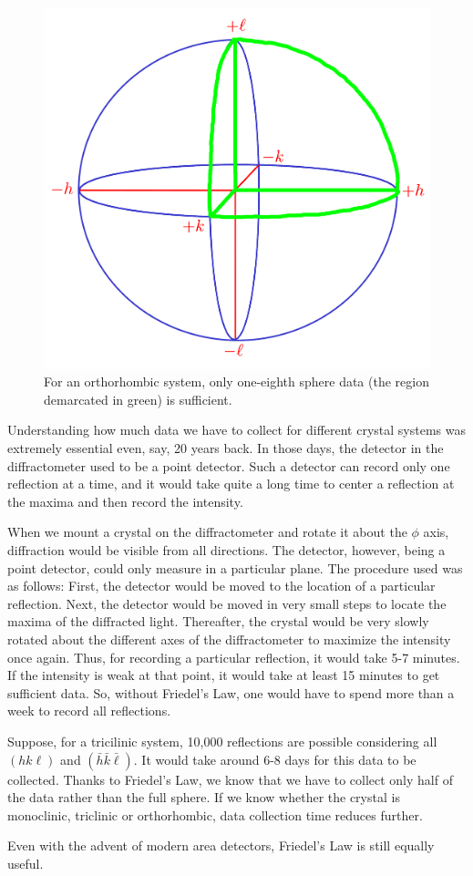 \begin{figure}
	\centering
	\includegraphics[scale=0.15]{one_eighth_sphere.png}
	\caption{\label{fig:one_eighth_sphere}For an orthorhombic system, only one-eighth sphere data (the region demarcated in green) is sufficient.}
\end{figure}

Understanding how much data we have to collect for different crystal systems was extremely essential even, say, 20 years back. In those days, the detector in the diffractometer used to be a point detector. Such a detector can record only one reflection at a time, and it would take quite a long time to center a reflection at the maxima and then record the intensity. 

When we mount a crystal on the diffractometer and rotate it about the $\phi$ axis, diffraction would be visible from all directions. The detector, however, being a point detector, could only measure in a particular plane. The procedure used was as follows: First, the detector would be moved to the location of a particular reflection. Next, the detector would be moved in very small steps to locate the maxima of the diffracted light. Thereafter, the crystal would be very slowly rotated about the different axes of the diffractometer to maximize the intensity once again. Thus, for recording a particular reflection, it would take 5-7 minutes. If the intensity is weak at that point, it would take at least 15 minutes to get sufficient data. So, without Friedel's Law, one would have to spend more than a week to record all reflections.

Suppose, for a tricilinic system, 10,000 reflections are possible considering all $(hk\ell)$ and $(\bar{h} \bar{k} \bar{\ell}).$ It would take around 6-8 days for this data to be collected. Thanks to Friedel's Law, we know that we have to collect only half of the data rather than the full sphere. If we know whether the crystal is monoclinic, triclinic or orthorhombic, data collection time reduces further.

Even with the advent of modern area detectors, Friedel's Law is still equally useful.